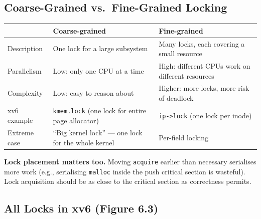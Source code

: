 \documentclass[11pt, a4paper]{article}
\begin{document}
\subsection{Coarse-Grained vs.\ Fine-Grained Locking}

\begin{center}
\renewcommand{\arraystretch}{1.3}
\begin{tabular}{@{}lp{5.2cm}p{5.2cm}@{}}
\toprule
& \textbf{Coarse-grained} & \textbf{Fine-grained} \\
\midrule
Description  & One lock for a large subsystem & Many locks, each covering a small resource \\
Parallelism  & Low: only one CPU at a time & High: different CPUs work on different resources \\
Complexity   & Low: easy to reason about & Higher: more locks, more risk of deadlock \\
xv6 example & \lstinline|kmem.lock| (one lock for entire page allocator) & \lstinline|ip->lock| (one lock per inode) \\
Extreme case & ``Big kernel lock'' --- one lock for the whole kernel & Per-field locking \\
\bottomrule
\end{tabular}
\end{center}

\textbf{Lock placement matters too.} Moving \lstinline|acquire| earlier than necessary serialises more work (e.g., serialising \lstinline|malloc| inside the push critical section is wasteful). Lock acquisition should be as close to the critical section as correctness permits.

\subsection{All Locks in xv6 (Figure 6.3)}
\end{document}
